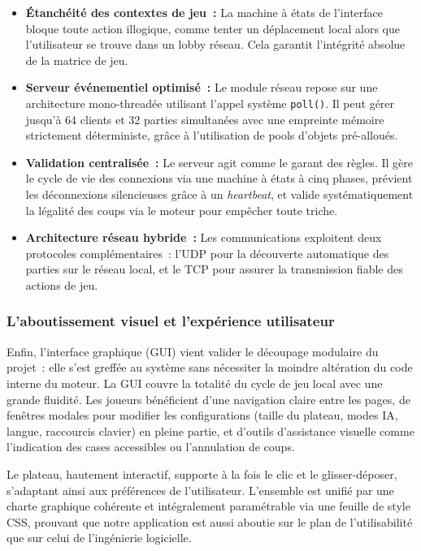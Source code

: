 \documentclass[a4paper]{article}
\begin{document}
\begin{itemize}    
    \item \textbf{Étanchéité des contextes de jeu~:} La machine à états de l'interface bloque toute action illogique, comme tenter un déplacement local alors que l'utilisateur se trouve dans un lobby réseau. Cela garantit l'intégrité absolue de la matrice de jeu.
    
    \item \textbf{Serveur événementiel optimisé~:} Le module réseau repose sur une architecture mono-threadée utilisant l'appel système \texttt{poll()}. Il peut gérer jusqu'à 64 clients et 32 parties simultanées avec une empreinte mémoire strictement déterministe, grâce à l'utilisation de pools d'objets pré-alloués.
    
    \item \textbf{Validation centralisée~:} Le serveur agit comme le garant des règles. Il gère le cycle de vie des connexions via une machine à états à cinq phases, prévient les déconnexions silencieuses grâce à un \textit{heartbeat}, et valide systématiquement la légalité des coups via le moteur pour empêcher toute triche.
    
    \item \textbf{Architecture réseau hybride~:} Les communications exploitent deux protocoles complémentaires~: l'UDP pour la découverte automatique des parties sur le réseau local, et le TCP pour assurer la transmission fiable des actions de jeu.
\end{itemize}

\subsubsection{L'aboutissement visuel et l'expérience utilisateur}

Enfin, l'interface graphique (GUI) vient valider le découpage modulaire du projet~: elle s'est greffée au système sans nécessiter la moindre altération du code interne du moteur. La GUI couvre la totalité du cycle de jeu local avec une grande fluidité. Les joueurs bénéficient d'une navigation claire entre les pages, de fenêtres modales pour modifier les configurations (taille du plateau, modes IA, langue, raccourcis clavier) en pleine partie, et d'outils d'assistance visuelle comme l'indication des cases accessibles ou l'annulation de coups.

Le plateau, hautement interactif, supporte à la fois le clic et le glisser-déposer, s'adaptant ainsi aux préférences de l'utilisateur. L'ensemble est unifié par une charte graphique cohérente et intégralement paramétrable via une feuille de style CSS, prouvant que notre application est aussi aboutie sur le plan de l'utilisabilité que sur celui de l'ingénierie logicielle.
\end{document}
